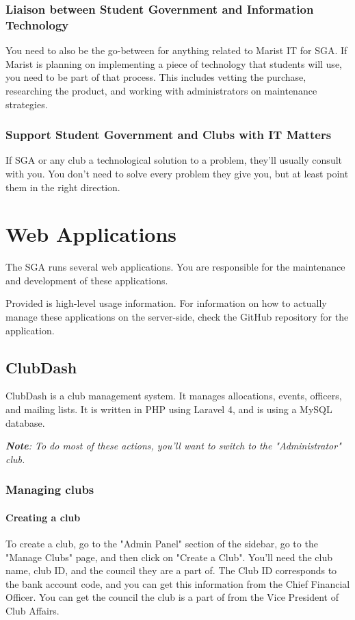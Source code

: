 \documentclass[11pt]{report}
\begin{document}
		\subsection{Liaison between Student Government and Information Technology}
			You need to also be the go-between for anything related to Marist IT for SGA. If Marist is planning on implementing a piece of technology that students will use, you need to be part of that process. This includes vetting the purchase, researching the product, and working with administrators on maintenance strategies.

		\subsection{Support Student Government and Clubs with IT Matters}
			If SGA or any club a technological solution to a problem, they'll usually consult with you. You don't need to solve every problem they give you, but at least point them in the right direction.

\chapter{Web Applications}
	The SGA runs several web applications. You are responsible for the maintenance and development of these applications.
	
	Provided is high-level usage information. For information on how to actually manage these applications on the server-side, check the GitHub repository for the application.

	\section{ClubDash}
		ClubDash is a club management system. It manages allocations, events, officers, and mailing lists. It is written in PHP using Laravel 4, and is using a MySQL database.
		
		\textit{\textbf{Note}: To do most of these actions, you'll want to switch to the "Administrator" club.}
		
		\subsection{Managing clubs}
			\subsubsection{Creating a club}
				To create a club, go to the "Admin Panel" section of the sidebar, go to the "Manage Clubs" page, and then click on "Create a Club". You'll need the club name, club ID, and the council they are a part of. The Club ID corresponds to the bank account code, and you can get this information from the Chief Financial Officer. You can get the council the club is a part of from the Vice President of Club Affairs.
			
\end{document}
